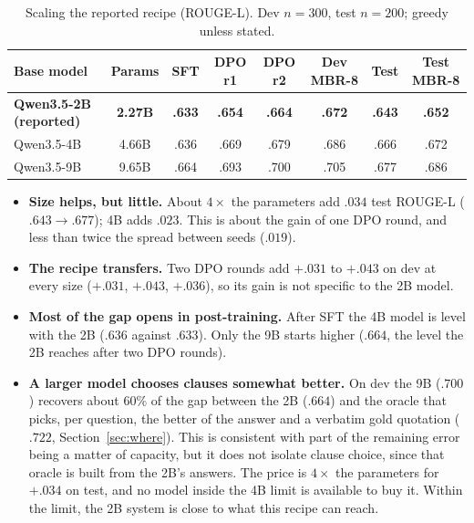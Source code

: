 \documentclass[11pt,a4paper]{article}
\newcommand{\rl}{ROUGE-L}
\newcommand{\best}[1]{\textbf{#1}}
\begin{document}
\begin{table}[H]
\centering\small
\caption{Scaling the reported recipe (\rl{}). Dev $n{=}300$, test $n{=}200$; greedy unless stated.}\label{tab:scaling}
\begin{tabular}{@{}lccccccc@{}}
\toprule
Base model & Params & SFT & DPO r1 & DPO r2 & Dev MBR-8 & Test & Test MBR-8\\
\midrule
\best{Qwen3.5-2B (reported)} & \best{2.27B} & \best{.633} & \best{.654} & \best{.664} & \best{.672} & \best{.643} & \best{.652}\\
Qwen3.5-4B & 4.66B & .636 & .669 & .679 & .686 & .666 & .672\\
Qwen3.5-9B & 9.65B & .664 & .693 & .700 & .705 & .677 & .686\\
\bottomrule
\end{tabular}
\end{table}
\begin{itemize}[leftmargin=*]
\item \textbf{Size helps, but little.} About $4\times$ the parameters add $.034$ test \rl{} ($.643\to.677$); 4B adds $.023$. This is about the gain of one DPO round, and less than twice the spread between seeds ($.019$).
\item \textbf{The recipe transfers.} Two DPO rounds add $+.031$ to $+.043$ on dev at every size ($+.031$, $+.043$, $+.036$), so its gain is not specific to the 2B model.
\item \textbf{Most of the gap opens in post-training.} After SFT the 4B model is level with the 2B ($.636$ against $.633$). Only the 9B starts higher ($.664$, the level the 2B reaches after two DPO rounds).
\item \textbf{A larger model chooses clauses somewhat better.} On dev the 9B ($.700$) recovers about $60\%$ of the gap between the 2B ($.664$) and the oracle that picks, per question, the better of the answer and a verbatim gold quotation ($.722$, Section~\ref{sec:where}). This is consistent with part of the remaining error being a matter of capacity, but it does not isolate clause choice, since that oracle is built from the 2B's answers. The price is $4\times$ the parameters for $+.034$ on test, and no model inside the 4B limit is available to buy it. Within the limit, the 2B system is close to what this recipe can reach.
\end{itemize}
\end{document}
